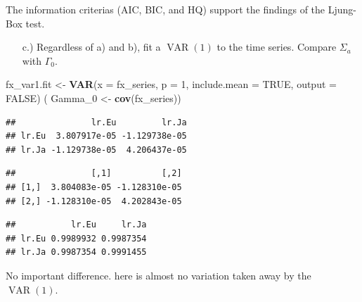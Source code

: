 \documentclass[12pt,a4paper]{article}
\newcommand{\VAR}{\operatorname{VAR}} %
\newenvironment{Shaded}{\begin{snugshade}}{\end{snugshade}}
\newcommand{\DataTypeTok}[1]{\textcolor[rgb]{0.13,0.29,0.53}{#1}}
\newcommand{\DecValTok}[1]{\textcolor[rgb]{0.00,0.00,0.81}{#1}}
\newcommand{\KeywordTok}[1]{\textcolor[rgb]{0.13,0.29,0.53}{\textbf{#1}}}
\newcommand{\NormalTok}[1]{#1}
\newcommand{\OperatorTok}[1]{\textcolor[rgb]{0.81,0.36,0.00}{\textbf{#1}}}
\newcommand{\OtherTok}[1]{\textcolor[rgb]{0.56,0.35,0.01}{#1}}
\newcommand{\StringTok}[1]{\textcolor[rgb]{0.31,0.60,0.02}{#1}}
\begin{document}
The information criterias (AIC, BIC, and HQ) support the findings of the
Ljung-Box test.

\begin{itemize}
  \item[c.)] Regardless of a) and b), fit a $\VAR(1)$ to the time series. Compare $\Sigma_a$ with $\Gamma_0$. 
\end{itemize}

\begin{Shaded}
\begin{Highlighting}[]
\NormalTok{fx_var1.fit <-}\StringTok{ }\KeywordTok{VAR}\NormalTok{(}\DataTypeTok{x =}\NormalTok{ fx_series, }\DataTypeTok{p =} \DecValTok{1}\NormalTok{, }\DataTypeTok{include.mean =} \OtherTok{TRUE}\NormalTok{, }\DataTypeTok{output =} \OtherTok{FALSE}\NormalTok{)}
\NormalTok{( Gamma_}\DecValTok{0}\NormalTok{ <-}\StringTok{ }\KeywordTok{cov}\NormalTok{(fx_series))}
\end{Highlighting}
\end{Shaded}

\begin{verbatim}
##               lr.Eu         lr.Ja
## lr.Eu  3.807917e-05 -1.129738e-05
## lr.Ja -1.129738e-05  4.206437e-05
\end{verbatim}

\begin{Shaded}
\end{Shaded}

\begin{verbatim}
##               [,1]          [,2]
## [1,]  3.804083e-05 -1.128310e-05
## [2,] -1.128310e-05  4.202843e-05
\end{verbatim}

\begin{Shaded}
\end{Shaded}

\begin{verbatim}
##           lr.Eu     lr.Ja
## lr.Eu 0.9989932 0.9987354
## lr.Ja 0.9987354 0.9991455
\end{verbatim}

No important difference. here is almost no variation taken away by the
\(\VAR(1)\).
\end{document}
